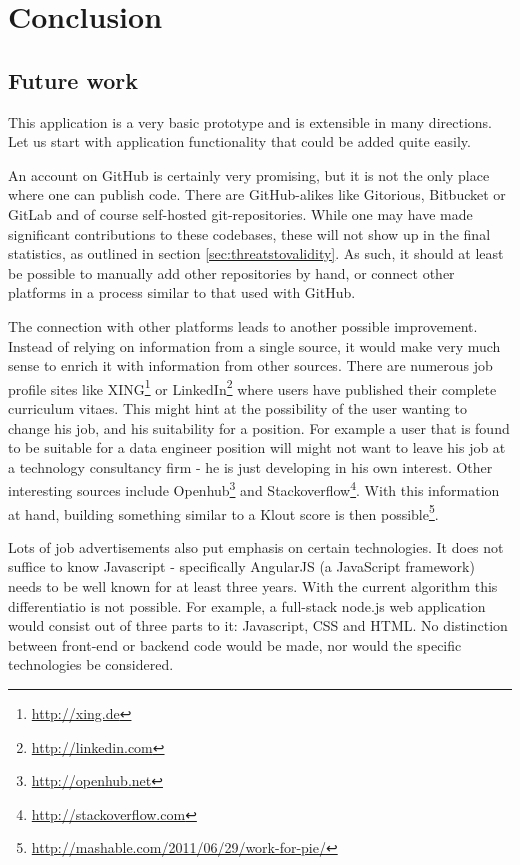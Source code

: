 \chapter{Conclusion}\label{ch:conclusion}
\section{Future work}
This application is a very basic prototype and is extensible in many directions.
Let us start with application functionality that could be added quite easily.

An account on GitHub is certainly very promising, but it is not the only
place where one can publish code. There are GitHub-alikes like Gitorious,
Bitbucket or GitLab and of course self-hosted git-repositories.
While one may have made significant contributions to these codebases,
these will not show up in the final statistics, as outlined in
section \ref{sec:threatstovalidity}. As such, it should
at least be possible to manually add other repositories by
hand, or connect other platforms in a process similar
to that used with GitHub.

The connection with other platforms leads to another possible improvement.
Instead of relying on information from a single source, it would make very
much sense to enrich it with information from other sources. There
are numerous job profile sites like XING\footnote{\url{http://xing.de}}
or LinkedIn\footnote{\url{http://linkedin.com}} where users have
published their complete curriculum vitaes. This might hint at the
possibility of the user wanting to change his job, and his suitability for
a position. For example a user that is found to be suitable for a data engineer
position will might not want to leave his job at a technology consultancy
firm - he is just developing in his own interest.
Other interesting sources include Openhub\footnote{\url{http://openhub.net}}
and Stackoverflow\footnote{\url{http://stackoverflow.com}}.
With this information at hand, building something similar to a Klout score
is then possible\footnote{\url{http://mashable.com/2011/06/29/work-for-pie/}}.
\newline

Lots of job advertisements also put emphasis on certain technologies.
It does not suffice to know Javascript - specifically AngularJS (a JavaScript framework)
needs to be well known for at least three years.
With the current algorithm this differentiatio is not possible.
For example, a full-stack node.js web application would consist out of three
parts to it: Javascript, CSS and HTML. No distinction between front-end
or backend code would be made, nor would the specific technologies be considered.
\newline

